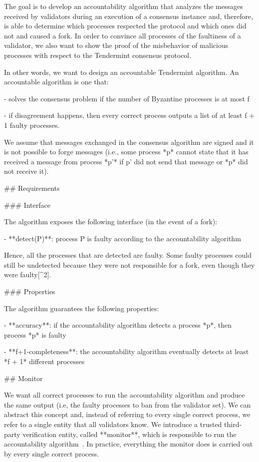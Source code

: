 \documentclass[a4paper,11pt,oneside]{report}
\begin{document}
\begin{markdown}

The goal is to develop an accountability algorithm that analyzes the messages received by validators during an execution of a consensus instance and, therefore, is able to determine which processes respected the protocol and which ones did not and caused a fork. 
In order to convince all processes of the faultiness of a validator, we also want to show the proof of the misbehavior of malicious processes with respect to the Tendermint consensus protocol.

In other words, we want to design an accountable Tendermint algorithm. An accountable algorithm is one that:

- solves the consensus problem if the number of Byzantine processes is at most f

- if disagreement happens, then every correct process outputs a list of at least f + 1 faulty processes.

We assume that messages exchanged in the consensus algorithm are signed and it is not possible to forge messages (i.e., some process *p* cannot state that it has received a message from process *p'* if p' did not send that message or *p* did not receive it).

## Requirements

### Interface

The algorithm exposes the following interface (in the event of a fork):

- **detect(P)**: process P is faulty according to the accountability algorithm

Hence, all the processes that are detected are faulty. Some faulty processes could still be undetected because they were not responsible for a fork, even though they were faulty[^2].

### Properties

The algorithm guarantees the following properties:

- **accuracy**: if the accountability algorithm detects a process *p*, then process *p* is faulty

- **f+1-completeness**: the accountability algorithm eventually detects at least *f + 1* different processes

## Monitor

We want all correct processes to run the accountability algorithm and produce the same output (i.e, the faulty processes to ban from the validator set). We can abstract this concept and, instead of referring to every single correct process, we refer to a single entity that all validators know. We introduce a trusted third-party verification entity, called **monitor**, which is responsible to run the accountability algorithm~\cite{fork-accountability-specs}. In practice, everything the monitor does is carried out by every single correct process.


\end{markdown}
\end{document}

